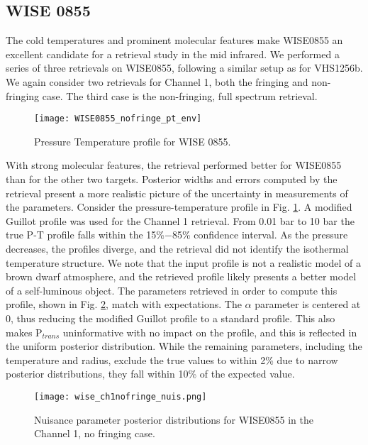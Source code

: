 \subsection{WISE 0855}
The cold temperatures and prominent molecular features make WISE0855 an excellent candidate for a retrieval study in the mid infrared.
We performed a series of three retrievals on WISE0855, following a similar setup as for VHS1256b.
We again consider two retrievals for Channel 1, both the fringing and non-fringing case.
The third case is the non-fringing, full spectrum retrieval.

\begin{figure}[t]
	\texttt{[image: WISE0855\_nofringe\_pt\_env]}
	\caption{Pressure Temperature profile for WISE 0855.}
	\label{fig:presWISE}
\end{figure}
With strong molecular features, the retrieval performed better for WISE0855 than for the other two targets.
Posterior widths and errors computed by the retrieval present a more realistic picture of the uncertainty in measurements of the parameters.
Consider the pressure-temperature profile in Fig. \ref{fig:presWISE}.
A modified Guillot profile was used for the Channel 1 retrieval.
From 0.01 bar to 10 bar the true P-T profile falls within the 15\%$-$85\% confidence interval.
As the pressure decreases, the profiles diverge, and the retrieval did not identify the isothermal temperature structure.
We note that the input profile is not a realistic model of a brown dwarf atmosphere, and the retrieved profile likely presents a better model of a self-luminous object.
The parameters retrieved in order to compute this profile, shown in Fig. \ref{fig:postWISEnuis}, match with expectations.
The $\alpha$ parameter is centered at 0, thus reducing the modified Guillot profile to a standard profile.
This also makes P$_{trans}$ uninformative with no impact on the profile, and this is reflected in the uniform posterior distribution.
While the remaining parameters, including the temperature and radius, exclude the true values to within 2\% due to narrow posterior distributions, they fall within 10\% of the expected value.

\begin{figure}[h]
	\texttt{[image: wise\_ch1nofringe\_nuis.png]}
	\caption{Nuisance parameter posterior distributions for WISE0855 in the Channel 1, no fringing case.}
	\label{fig:postWISEnuis}
\end{figure}

